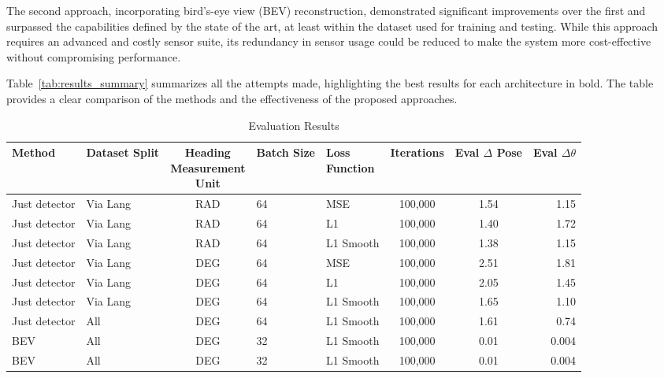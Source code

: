 The second approach, incorporating bird’s-eye view (BEV) reconstruction, demonstrated significant improvements over the first and surpassed the capabilities defined by the state of the art, at least within the dataset used for training and testing. While this approach requires an advanced and costly sensor suite, its redundancy in sensor usage could be reduced to make the system more cost-effective without compromising performance.

Table~\ref{tab:results_summary} summarizes all the attempts made, highlighting the best results for each architecture in bold. The table provides a clear comparison of the methods and the effectiveness of the proposed approaches.


\begin{table}[H]
\centering
\caption{Evaluation Results}
\label{tab:evaluation_results}
\scriptsize %
\renewcommand{\arraystretch}{1} %
\begin{tabular}{llcllccr}
\toprule
\textbf{Method} & \textbf{Dataset Split} & \makecell{\textbf{Heading}\\\textbf{Measurement}\\\textbf{Unit}} & \textbf{Batch Size} & \makecell{\textbf{Loss}\\\textbf{Function}} & \textbf{Iterations} & \makecell{\textbf{Eval}\\$\Delta$ \textbf{Pose}} & \makecell{\textbf{Eval}\\$\Delta \theta$} \\
\midrule
Just detector & Via Lang & RAD & 64 & MSE        & 100,000 & 1.54 & 1.15 \\
Just detector & Via Lang & RAD & 64 & L1         & 100,000 & 1.40 & 1.72 \\
Just detector & Via Lang & RAD & 64 & L1 Smooth  & 100,000 & 1.38 & 1.15 \\
Just detector & Via Lang & DEG & 64 & MSE        & 100,000 & 2.51 & 1.81 \\
Just detector & Via Lang & DEG & 64 & L1         & 100,000 & 2.05 & 1.45 \\
Just detector & Via Lang & DEG & 64 & L1 Smooth  & 100,000 & 1.65 & 1.10 \\
Just detector & All      & DEG & 64 & L1 Smooth  & 100,000 & 1.61 & 0.74 \\
BEV           & All      & DEG & 32 & L1 Smooth  & 100,000 & 0.01 & 0.004 \\
BEV           & All      & DEG & 32 & L1 Smooth  & 100,000 & 0.01 & 0.004 \\
\bottomrule
\end{tabular}
\end{table}



